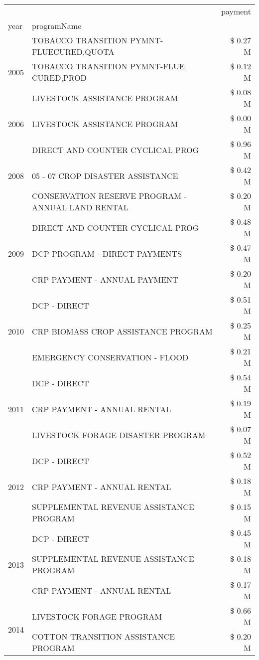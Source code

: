 \begin{tabular}{llr}
\toprule
 &  & payment \\
year & programName &  \\
\midrule
\multirow[t]{3}{*}{2005} & TOBACCO TRANSITION PYMNT-FLUECURED,QUOTA & \$ 0.27 M \\
 & TOBACCO TRANSITION PYMNT-FLUE CURED,PROD & \$ 0.12 M \\
 & LIVESTOCK ASSISTANCE PROGRAM & \$ 0.08 M \\
\cline{1-3}
2006 & LIVESTOCK ASSISTANCE PROGRAM & \$ 0.00 M \\
\cline{1-3}
\multirow[t]{3}{*}{2008} & DIRECT AND COUNTER CYCLICAL PROG & \$ 0.96 M \\
 & 05 - 07 CROP DISASTER ASSISTANCE & \$ 0.42 M \\
 & CONSERVATION RESERVE PROGRAM - ANNUAL LAND RENTAL & \$ 0.20 M \\
\cline{1-3}
\multirow[t]{3}{*}{2009} & DIRECT AND COUNTER CYCLICAL PROG & \$ 0.48 M \\
 & DCP PROGRAM - DIRECT PAYMENTS & \$ 0.47 M \\
 & CRP PAYMENT - ANNUAL PAYMENT & \$ 0.20 M \\
\cline{1-3}
\multirow[t]{3}{*}{2010} & DCP - DIRECT & \$ 0.51 M \\
 & CRP BIOMASS CROP ASSISTANCE PROGRAM & \$ 0.25 M \\
 & EMERGENCY CONSERVATION - FLOOD & \$ 0.21 M \\
\cline{1-3}
\multirow[t]{3}{*}{2011} & DCP - DIRECT & \$ 0.54 M \\
 & CRP PAYMENT - ANNUAL RENTAL & \$ 0.19 M \\
 & LIVESTOCK FORAGE DISASTER PROGRAM & \$ 0.07 M \\
\cline{1-3}
\multirow[t]{3}{*}{2012} & DCP - DIRECT & \$ 0.52 M \\
 & CRP PAYMENT - ANNUAL RENTAL & \$ 0.18 M \\
 & SUPPLEMENTAL REVENUE ASSISTANCE PROGRAM & \$ 0.15 M \\
\cline{1-3}
\multirow[t]{3}{*}{2013} & DCP - DIRECT & \$ 0.45 M \\
 & SUPPLEMENTAL REVENUE ASSISTANCE PROGRAM & \$ 0.18 M \\
 & CRP PAYMENT - ANNUAL RENTAL & \$ 0.17 M \\
\cline{1-3}
\multirow[t]{3}{*}{2014} & LIVESTOCK FORAGE PROGRAM & \$ 0.66 M \\
 & COTTON TRANSITION ASSISTANCE PROGRAM & \$ 0.20 M \\

\end{tabular}
